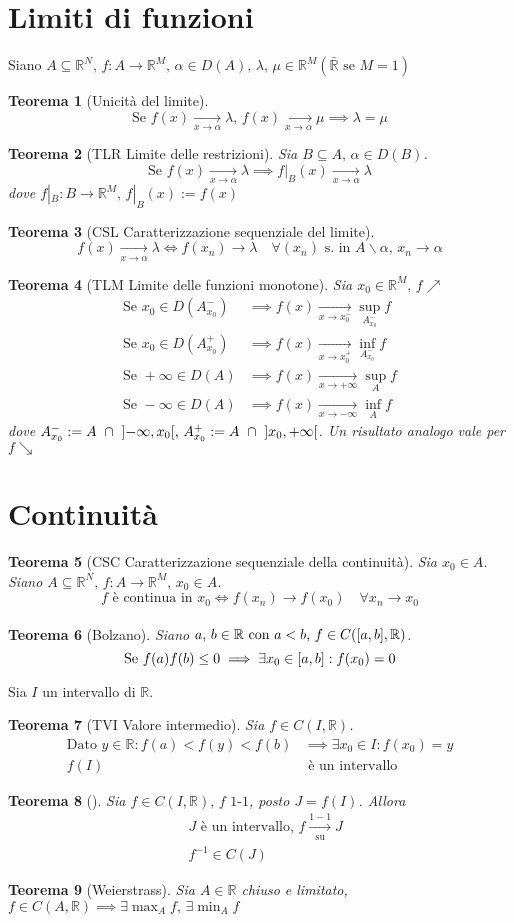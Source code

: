 \documentclass[10pt,a4paper]{article}
\newtheorem{teorema}{Teorema}[section]
\newcommand{\teor}[2][]{\begin{teorema}[#1]#2\end{teorema}}
\newcommand{\R}{\mathbb{R}}
\newcommand{\Lim}[1][]{\xrightarrow[#1]{}}
\renewcommand{\,}{\text{, }}
\begin{document}
\section{Limiti di funzioni}
Siano $A \subseteq \R^N \, f:A \rightarrow \R^M \, \alpha \in D(A) \, \lambda\, \mu \in \R^M (\bar{\R} \text{ se } M = 1)$
\teor[Unicità del limite]{
    \[
        \text{Se } f(x) \Lim[x \to \alpha] \lambda\, f(x) \Lim[x \to \alpha] \mu \implies \lambda = \mu
    \]
}
\teor[TLR Limite delle restrizioni]{
    Sia $B \subseteq A\, \alpha \in D(B)$.
    \[
        \text{Se } f(x) \Lim[x \to \alpha] \lambda \implies f|_B(x) \Lim[x \to \alpha] \lambda
    \]
    dove $f|_B: B \rightarrow \R^M \, f|_B(x) := f(x)$
}
\teor[CSL Caratterizzazione sequenziale del limite]{
    \[
        f(x) \Lim[x \to \alpha] \lambda \iff f(x_n) \Lim \lambda \quad \forall (x_n) \text{ s. in } A \smallsetminus {\alpha} \, x_n \to \alpha
    \]
}
\teor[TLM Limite delle funzioni monotone]{
    Sia $x_0 \in \R^M\, f \nearrow$
    \begin{align*}
        \text{Se } x_0 \in D(A_{x_0}^-) & \implies f(x) \Lim[x \to x_0^-] \sup_{A_{x_0}^-}f \\
        \text{Se } x_0 \in D(A_{x_0}^+) & \implies f(x) \Lim[x \to x_0^+] \inf_{A_{x_0}^-}f \\
        \text{Se } +\infty \in D(A)     & \implies f(x) \Lim[x \to +\infty] \sup_{A}f       \\
        \text{Se } -\infty \in D(A)     & \implies f(x) \Lim[x \to -\infty] \inf_{A}f
    \end{align*}
    dove $A_{x_0}^- := A \text{ }\cap \text{ } \interval[open]{-\infty}{ x_0} \, A_{x_0}^+ := A \text{ }\cap \text{ } \interval[open]{x_0}{ +\infty}$. Un risultato analogo vale per $f \searrow$
}
\section{Continuità}
\teor[CSC Caratterizzazione sequenziale della continuità]{Sia $x_0 \in A$.
    Siano $A \subseteq \R^N \, f:A \to \R^M \, x_0 \in A$.
    \[
        f \text{ è continua in } x_0 \iff f(x_n) \Lim f(x_0) \quad \forall x_n \to x_0
    \]
}
\teor[Bolzano]{
    Siano $a\, b \in \R \text{ con } a < b\, f \in C(\interval{a}{b}, \R)$.
    \[
        \text{Se } f(a)f(b) \leq 0 \implies \exists x_0 \in \interval{a}{b} : f(x_0) = 0
    \]
}
Sia $I$ un intervallo di $\R$.
\teor[TVI Valore intermedio]{
    Sia $f \in C(I,\R)$.
    \begin{align*}
        \text{Dato } y \in \R : f(a) < f(y) < f(b) & \implies \exists x_0 \in I : f(x_0) = y \\
        f(I)                                       & \text{ è un intervallo}
    \end{align*}
}
\teor{
    Sia $f \in C(I, \R)\, f \text{ 1-1}$, posto $J = f(I)$. Allora
    \begin{align*}
         & J \text{ è un intervallo, } f \xrightarrow[\text{su}]{1-1} J \\
         & f^{-1} \in C(J)
    \end{align*}
}
\teor[Weierstrass]{
    Sia $A \in \R$ chiuso e limitato, $f \in C(A, \R) \implies \exists \max_A f \, \exists \min_A f$

}
\end{document}
